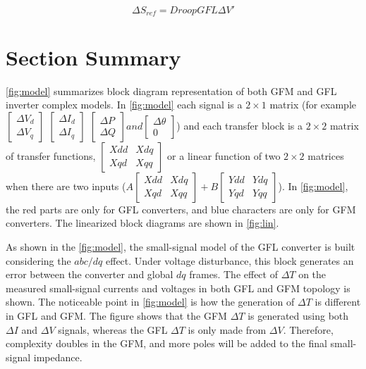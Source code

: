 \begin{equation}\label{sref4}
\Delta S_{ref}=DroopGFL\Delta V'
\end{equation}
\section{Section Summary}

\ref{fig:model} summarizes block diagram representation of both \gls{GFM} and \gls{GFL} inverter complex models. In \ref{fig:model} each signal is a $2 \times 1$ matrix (for example $ \begin{bmatrix}\Delta V_d \\ \Delta V_q \end{bmatrix} $ $ \begin{bmatrix}\Delta I_d \\ \Delta I_q \end{bmatrix} $ $ \begin{bmatrix}\Delta P \\ \Delta Q \end{bmatrix} and \begin{bmatrix}\Delta \theta \\ 0\end{bmatrix}$) and each transfer block is a $2\times2$ matrix of transfer functions, $ \begin{bmatrix}Xdd & Xdq \\Xqd & Xqq\end{bmatrix} $ or a linear function of two $2\times2$ matrices when there are two inputs ($ A\begin{bmatrix}Xdd & Xdq \\Xqd & Xqq\end{bmatrix}+B\begin{bmatrix}Ydd & Ydq \\Yqd & Yqq\end{bmatrix} $). In \ref{fig:model}, the red parts are only for \gls{GFL} converters, and blue characters are only for GFM converters. The linearized block diagrams are shown in \ref{fig:lin}.

As shown in the \ref{fig:model}, the small-signal model of the GFL converter is built considering the $abc/dq$ effect. Under voltage disturbance, this block generates an error between the converter and global $dq$ frames. The effect of $\Delta T$ on the measured small-signal currents and voltages in both GFL and GFM topology is shown. The noticeable point in \ref{fig:model} is how the generation of $\Delta T$ is different in GFL and GFM. The figure shows that the GFM $\Delta T$ is generated using both $\Delta I$ and $\Delta V$ signals, whereas the GFL $\Delta T$ is only made from $\Delta V$. Therefore, complexity doubles in the GFM, and more poles will be added to the final small-signal impedance.

